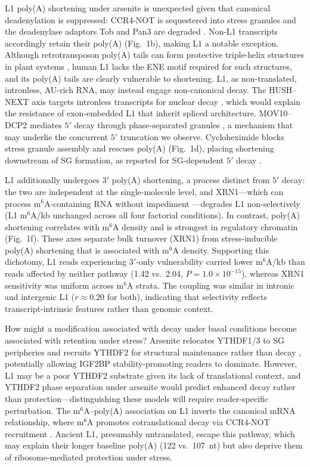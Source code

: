 \documentclass[11pt]{article}
\newcommand{\msix}{m$^6$A}
\begin{document}
L1 poly(A) shortening under arsenite is unexpected given that canonical
deadenylation is suppressed: CCR4-NOT is sequestered into stress
granules \citep[preprint]{Bhatt2025} and the deadenylase adaptors Tob
and Pan3 are degraded \citep{Funakoshi2015}. Non-L1 transcripts
accordingly retain their poly(A) (Fig.~1b), making L1 a notable
exception. Although
retrotransposon poly(A) tails can form protective triple-helix
structures in plant systems \citep{Li2025triplehelix}, human L1 lacks
the ENE motif required for such structures, and its poly(A) tails are
clearly vulnerable to shortening. L1, as non-translated, intronless,
AU-rich RNA, may instead engage non-canonical decay. The HUSH--NEXT
axis targets intronless transcripts for nuclear decay
\citep{Tchasovnikarova2022,Garland2022}, which would explain the
resistance of exon-embedded L1 that inherit spliced architecture.
MOV10--DCP2 mediates $5'$ decay through phase-separated granules
\citep{LiXembr2023}, a mechanism that may underlie the concurrent $5'$
truncation we observe. Cycloheximide blocks stress granule assembly and
rescues poly(A) (Fig.~1d), placing shortening downstream of SG
formation, as reported for SG-dependent $5'$ decay \citep{deMuro2024}.

L1 additionally undergoes $3'$ poly(A) shortening, a process distinct
from $5'$ decay: the two are independent at the single-molecule level,
and XRN1---which can process \msix{}-containing RNA without impediment
\citep{Athapattu2021}---degrades L1 non-selectively (L1 \msix{}/kb
unchanged across all four factorial conditions). In contrast, poly(A)
shortening correlates with \msix{} density and is strongest in
regulatory chromatin (Fig.~1f). These axes separate bulk turnover
(XRN1) from stress-inducible poly(A) shortening that is associated
with \msix{} density. Supporting this dichotomy, L1 reads experiencing
$3'$-only vulnerability carried lower \msix{}/kb than reads affected by
neither pathway (1.42 vs.\ 2.04, $P = 1.0 \times 10^{-15}$), whereas
XRN1 sensitivity was uniform across \msix{} strata. The coupling was
similar in intronic and intergenic L1 ($r \approx 0.20$ for both),
indicating that selectivity reflects transcript-intrinsic features
rather than genomic context.

How might a modification associated with decay under basal conditions
become associated with retention under stress? Arsenite relocates
YTHDF1/3 to SG peripheries and recruits YTHDF2 for structural
maintenance rather than decay \citep{FuZhuang2020,LiuSciAdv2024},
potentially allowing IGF2BP stability-promoting readers
\citep{Huang2018igf} to dominate. However, L1 may be a poor YTHDF2
substrate given its lack of translational context, and YTHDF2 phase
separation under arsenite \citep{Wang2023ythdf2} would predict
enhanced decay rather than protection---distinguishing these models
will require reader-specific perturbation. The \msix{}--poly(A)
association on L1 inverts the canonical mRNA relationship, where
\msix{} promotes cotranslational decay via CCR4-NOT recruitment
\citep{Lima2017,Absmeier2024}. Ancient L1, presumably untranslated,
escape this pathway, which may explain their longer baseline poly(A)
(122 vs.\ 107~nt) but also deprive them of ribosome-mediated
protection under stress.
\end{document}
